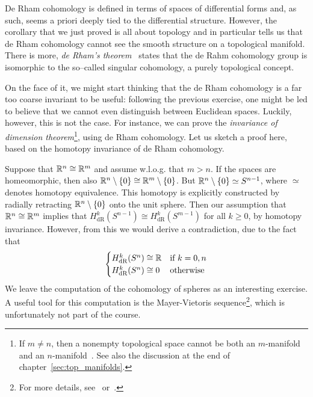 \begin{remark}\label{rmk:ch_topology_domain_invariance}
  De Rham cohomology is defined in terms of spaces of differential forms and, as such, seems a priori deeply tied to the differential structure. However, the corollary that we just proved is all about topology and in particular tells us that de Rham cohomology cannot see the smooth structure on a topological manifold.
  There is more, \emph{de Rham's theorem}~\cite[Theorem 18.14]{book:lee} states that the de Rahm cohomology group is isomorphic to the so--called singular cohomology, a purely topological concept.

  On the face of it, we might start thinking that the de Rham cohomology is a far too coarse invariant to be useful: following the previous exercise, one might be led to believe that we cannot even distinguish between Euclidean spaces. Luckily, however, this is not the case.
  For instance, we can prove the \emph{invariance of dimension theorem}\footnote{If $m\neq n$, then a nonempty topological space cannot be both an $m$-manifold and an $n$-manifold~\cite[Problem 13-3]{book:lee:topology}. See also the discussion at the end of chapter~\ref{sec:top_manifolds}.}, using de Rham cohomology. Let us sketch a proof here, based on the homotopy invariance of de Rham cohomology.

  Suppose that $\mathbb{R}^n\cong\mathbb{R}^m$ and assume w.l.o.g. that $m>n$. If the spaces are homeomorphic, then also $\mathbb{R}^n\setminus\{0\}\cong\mathbb{R}^m\setminus\{0\}$. But $\mathbb{R}^n\setminus\{0\}\simeq S^{n-1}$, where $\simeq$ denotes homotopy equivalence. This homotopy is explicitly constructed by radially retracting $\mathbb{R}^n\setminus\{0\}$ onto the unit sphere. Then our assumption that $\mathbb{R}^n\cong\mathbb{R}^m$ implies that $H^k_{\mathrm{dR}}(S^{n-1})\cong H^k_{\mathrm{dR}}(S^{m-1})$ for all $k\geq 0$,
  by homotopy invariance. However, from this we would derive a contradiction, due to the fact that
  \begin{equation}
    \begin{cases}
      H_{\mathrm{dR}}^k(S^n)\cong\mathbb{R} & \mbox{if }k=0,n  \\
      H_{\mathrm{dR}}^k(S^n)\cong 0 & \mbox{otherwise}
    \end{cases}
  \end{equation}
  We leave the computation of the cohomology of spheres as an interesting exercise.
  A useful tool for this computation is the Mayer-Vietoris sequence\footnote{For more details, see~\cite[Chapter 17.3]{book:lee} or~\cite[Chapter 26]{book:tu}.}, which is unfortunately not part of the course.
\end{remark}

